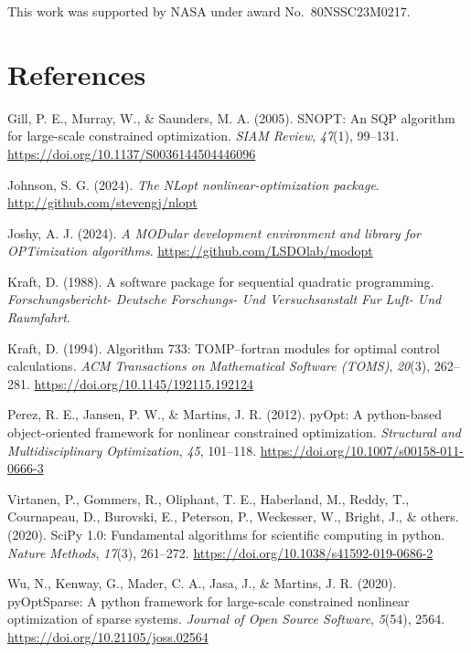 \documentclass[
]{article}
\newlength{\cslhangindent}
\newenvironment{CSLReferences}[2] %
 {\begin{list}{}{%
  \setlength{\itemindent}{0pt}
  \setlength{\leftmargin}{0pt}
  \setlength{\parsep}{0pt}
  \ifodd #1
   \setlength{\leftmargin}{\cslhangindent}
   \setlength{\itemindent}{-1\cslhangindent}
  \fi
  \setlength{\itemsep}{#2\baselineskip}}}
 {\end{list}}
\begin{document}
This work was supported by NASA under award No.~80NSSC23M0217.

\section*{References}\label{references}

\label{refs}
\begin{CSLReferences}{1}{0}
Gill, P. E., Murray, W., \& Saunders, M. A. (2005). SNOPT: An SQP
algorithm for large-scale constrained optimization. \emph{SIAM Review},
\emph{47}(1), 99--131. \url{https://doi.org/10.1137/S0036144504446096}

Johnson, S. G. (2024). \emph{The {NLopt} nonlinear-optimization
package}. \url{http://github.com/stevengj/nlopt}

Joshy, A. J. (2024). \emph{A MODular development environment and library
for OPTimization algorithms}. \url{https://github.com/LSDOlab/modopt}

Kraft, D. (1988). A software package for sequential quadratic
programming. \emph{Forschungsbericht- Deutsche Forschungs- Und
Versuchsanstalt Fur Luft- Und Raumfahrt}.

Kraft, D. (1994). Algorithm 733: TOMP--fortran modules for optimal
control calculations. \emph{ACM Transactions on Mathematical Software
(TOMS)}, \emph{20}(3), 262--281.
\url{https://doi.org/10.1145/192115.192124}

Perez, R. E., Jansen, P. W., \& Martins, J. R. (2012). pyOpt: A
python-based object-oriented framework for nonlinear constrained
optimization. \emph{Structural and Multidisciplinary Optimization},
\emph{45}, 101--118. \url{https://doi.org/10.1007/s00158-011-0666-3}

Virtanen, P., Gommers, R., Oliphant, T. E., Haberland, M., Reddy, T.,
Cournapeau, D., Burovski, E., Peterson, P., Weckesser, W., Bright, J.,
\& others. (2020). SciPy 1.0: Fundamental algorithms for scientific
computing in python. \emph{Nature Methods}, \emph{17}(3), 261--272.
\url{https://doi.org/10.1038/s41592-019-0686-2}

Wu, N., Kenway, G., Mader, C. A., Jasa, J., \& Martins, J. R. (2020).
pyOptSparse: A python framework for large-scale constrained nonlinear
optimization of sparse systems. \emph{Journal of Open Source Software},
\emph{5}(54), 2564. \url{https://doi.org/10.21105/joss.02564}

\end{CSLReferences}
\end{document}
